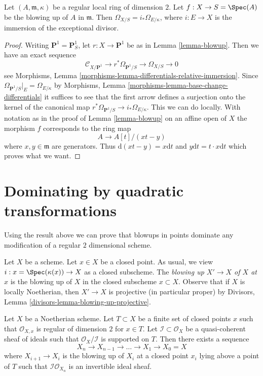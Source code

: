 \begin{lemma}
\label{lemma-differentials-of-blowup}
Let $(A, \mathfrak m, \kappa)$ be a regular local ring of dimension $2$.
Let $f : X \to S = \Spec(A)$ be the blowing up of $A$ in $\mathfrak m$.
Then $\Omega_{X/S} = i_*\Omega_{E/\kappa}$, where $i : E \to X$
is the immersion of the exceptional divisor.
\end{lemma}

\begin{proof}
Writing $\mathbf{P}^1 = \mathbf{P}^1_S$, let
$r : X \to \mathbf{P}^1$ be as in Lemma \ref{lemma-blowup}.
Then we have an exact sequence
$$
\mathcal{C}_{X/\mathbf{P}^1} \to r^*\Omega_{\mathbf{P}^1/S} \to
\Omega_{X/S} \to 0
$$
see Morphisms, Lemma \ref{morphisms-lemma-differentials-relative-immersion}.
Since $\Omega_{\mathbf{P}^1/S}|_E = \Omega_{E/\kappa}$ by
Morphisms, Lemma \ref{morphisms-lemma-base-change-differentials}
it suffices to see that the first arrow defines a surjection
onto the kernel of the canonical map
$r^*\Omega_{\mathbf{P}^1/S} \to i_*\Omega_{E/\kappa}$.
This we can do locally. With notation as in the proof of
Lemma \ref{lemma-blowup} on an affine open of $X$ the morphism $f$
corresponds to the ring map
$$
A \to A[t]/(xt - y)
$$
where $x, y \in \mathfrak m$ are generators. Thus
$\text{d}(xt - y) = x\text{d}t$ and $y\text{d}t = t \cdot x \text{d}t$
which proves what we want.
\end{proof}



\section{Dominating by quadratic transformations}
\label{section-dominating-by-quadratic}

\noindent
Using the result above we can prove that blowups in points dominate
any modification of a regular $2$ dimensional scheme.

\medskip\noindent
Let $X$ be a scheme. Let $x \in X$ be a closed point. As usual, we view
$i : x = \Spec(\kappa(x)) \to X$ as a closed subscheme.
The {\it blowing up $X' \to X$ of $X$ at $x$} is the blowing up of $X$
in the closed subscheme $x \subset X$. Observe that if $X$ is locally
Noetherian, then $X' \to X$ is projective (in particular proper) by
Divisors, Lemma \ref{divisors-lemma-blowing-up-projective}.

\begin{lemma}
\label{lemma-make-ideal-principal}
Let $X$ be a Noetherian scheme. Let $T \subset X$ be a finite set of
closed points $x$ such that $\mathcal{O}_{X, x}$ is
regular of dimension $2$ for $x \in T$.
Let $\mathcal{I} \subset \mathcal{O}_X$ be a quasi-coherent
sheaf of ideals such that $\mathcal{O}_X/\mathcal{I}$ is supported
on $T$.
Then there exists a sequence
$$
X_n \to X_{n - 1} \to \ldots \to X_1 \to X_0 = X
$$
where $X_{i + 1} \to X_i$ is the blowing up of $X_i$ at a closed
point $x_i$ lying above a point of $T$ such that
$\mathcal{I}\mathcal{O}_{X_n}$ is an invertible ideal sheaf.
\end{lemma}

